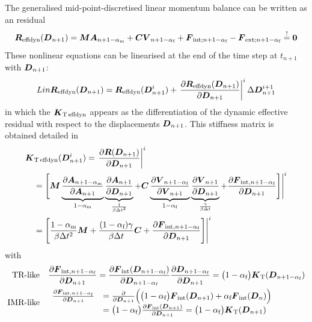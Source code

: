 The generalised mid-point-discretised linear momentum balance can be written
as an residual
\begin{equation}
  \boldsymbol{R}_{\text{effdyn}}(\boldsymbol{D}_{n+1})
  = \boldsymbol{M} \boldsymbol{A}_{n+1-\alpha_\text{m}}
  + \boldsymbol{C} \boldsymbol{V}_{n+1-\alpha_\text{f}}
  + \boldsymbol{F}_{\text{int};n+1-\alpha_\text{f}}
  - \boldsymbol{F}_{\text{ext};n+1-\alpha_\text{f}}
  \stackrel{!}{=} \boldsymbol{0}
\end{equation}
These nonlinear equations can be linearised at the end of the time step at
$t_{n+1}$ with $\boldsymbol{D}_{n+1}$: 
\begin{equation}
  Lin\boldsymbol{R}_{\text{effdyn}}(\boldsymbol{D}_{n+1})
  = \boldsymbol{R}_{\text{effdyn}}(\boldsymbol{D}_{n+1}^i) 
  + \left.\frac{\partial \boldsymbol{R}_{\text{effdyn}}(\boldsymbol{D}_{n+1})}
    {\partial \boldsymbol{D}_{n+1}}\right|^{i}  \Delta\boldsymbol{D}_{n+1}^{i+1}
\end{equation}
in which the 
$\boldsymbol{K}_{\text{T}\,\text{effdyn}}$ appears as the differentiation of the dynamic
effective residual with respect to the displacements $\boldsymbol{D}_{n+1}$. This
stiffness matrix is obtained detailed in\\
\begin{equation}
\begin{aligned}
&  \boldsymbol{K}_{\text{T}\,\text{effdyn}}(\boldsymbol{D}_{n+1}^i)
   = \left.\frac{\partial \boldsymbol{R}(\boldsymbol{D}_{n+1})}{\partial \boldsymbol{D}_{n+1}}\right|^{i}
\\
& 
  \quad = \Bigg.\Bigg[\boldsymbol{M} 
          \underbrace{\frac{\partial \boldsymbol{A}_{n+1-\alpha_\text{m}}}{\partial \boldsymbol{A}_{n+1}}}_{1-\alpha_\text{m}}
          \underbrace{\frac{\partial\boldsymbol{A}_{n+1}}{\partial\boldsymbol{D}_{n+1}}}_{\frac{1}{\beta\Delta t^2}}
   +     \boldsymbol{C}
          \underbrace{\frac{\partial \boldsymbol{V}_{n+1-\alpha_\text{f}}}{\partial \boldsymbol{V}_{n+1}}}_{1-\alpha_\text{f}}
          \underbrace{\frac{\partial\boldsymbol{V}_{n+1}}{\partial\boldsymbol{D}_{n+1}}}_{\frac{\gamma}{\beta\Delta t}}
   +     \frac{\partial\boldsymbol{F}_{\text{int},n+1-\alpha_\text{f}}}{\partial\boldsymbol{D}_{n+1}}
    \Bigg]\Bigg|^i
\\
&  \quad = \Bigg.\Bigg[
   \frac{1-\alpha_\text{m}}{\beta \Delta t^2} \boldsymbol{M}
   + \frac{(1-\alpha_\text{f})\gamma}{\beta\Delta t} \boldsymbol{C}
   + \frac{\partial\boldsymbol{F}_{\text{int},n+1-\alpha_\text{f}}}{\partial\boldsymbol{D}_{n+1}}
   \Bigg]\Bigg|^i
\end{aligned}
\end{equation}
with
\begin{align}
   \text{TR-like} & \quad \frac{\partial\boldsymbol{F}_{\text{int},n+1-\alpha_\text{f}}}{\partial\boldsymbol{D}_{n+1}}
   = \frac{\partial\boldsymbol{F}_{\text{int}}(\boldsymbol{D}_{n+1-\alpha_\text{f}})}{\partial\boldsymbol{D}_{n+1-\alpha_\text{f}}} 
   \frac{\partial\boldsymbol{D}_{n+1-\alpha_\text{f}}}{\partial\boldsymbol{D}_{n+1}}
   = \big( 1-\alpha_\text{f} \big)  \boldsymbol{K}_{\text{T}}(\boldsymbol{D}_{n+1-\alpha_\text{f}})
\\
   \text{IMR-like} & \quad \begin{array}{ll} \frac{\partial\boldsymbol{F}_{\text{int},n+1-\alpha_\text{f}}}{\partial\boldsymbol{D}_{n+1}}
   & = \frac{\partial}{\partial\boldsymbol{D}_{n+1}} \Big( \big( 1- \alpha_\text{f} \big) \boldsymbol{F}_{\text{int}}(\boldsymbol{D}_{n+1})
    + \alpha_\text{f} \boldsymbol{F}_{\text{int}}(\boldsymbol{D}_{n}) \Big) \\
   & = \big( 1-\alpha_\text{f} \big)  \frac{\partial\boldsymbol{F}_{\text{int}}(\boldsymbol{D}_{n+1})}{\partial\boldsymbol{D}_{n+1}}
   = \big( 1-\alpha_\text{f} \big) \boldsymbol{K}_{\text{T}}(\boldsymbol{D}_{n+1})
   \end{array}
\end{align}

